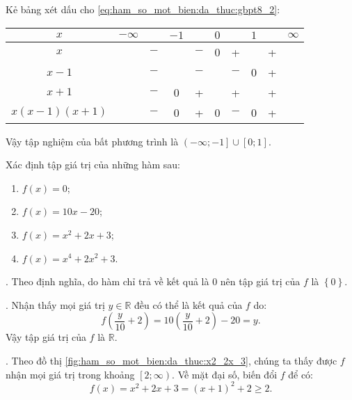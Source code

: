 Kẻ bảng xét dấu cho \ref{eq:ham_so_mot_bien:da_thuc:gbpt8_2}:
\begin{table}[H]
   \centering
   \begin{tabular}{|c|ccccccccc|}
      \hline
      $x$           & $-\infty$ &     & $-1$ &     & $0$ &     & $1$ &   & $\infty$ \\
      \hline
      $x$           &           & $-$ &      & $-$ &  0  &  +  &     & + &           \\
      \hline
      $x-1$         &           & $-$ &      & $-$ &     & $-$ &  0  & + &           \\
      \hline
      $x+1$         &           & $-$ &  0   &  +  &     &  +  &     & + &           \\
      \hline
      $x(x-1)(x+1)$ &           & $-$ &  0   &  +  &  0  & $-$ &  0  & + &           \\
      \hline
      \end{tabular}
\end{table}

Vậy tập nghiệm của bất phương trình là $\left(-\infty; -1\right] \cup \left[0; 1\right]$.

\exercise Xác định tập giá trị của những hàm sau:
\begin{multicols}{2}
   \begin{enumerate}
      \item $f(x) = 0$;
      \item $f(x) = 10x - 20$;
      \item $f(x) = x^2 + 2x + 3$;
      \item $f(x) = x^4 + 2x^2 + 3$.
   \end{enumerate}
\end{multicols}

\solution

\setcounter{subexercise}{1}
. Theo định nghĩa, do hàm chỉ trả về kết quả là $0$ nên tập giá trị của $f$ là $\left\{0\right\}$.

. Nhận thấy mọi giá trị $y \in \mathbb{R}$ đều có thể là kết quả của $f$ do:
$$f\left(\frac{y}{10} + 2\right) = 10 \left(\frac{y}{10} + 2\right) - 20 = y.$$
Vậy tập giá trị của $f$ là $\mathbb{R}$.

. Theo đồ thị \ref{fig:ham_so_mot_bien:da_thuc:x2_2x_3}, chúng ta thấy được $f$ nhận mọi giá trị trong khoảng $\left[2; \infty\right)$. Về mặt đại số, biến đổi $f$ để có:
$$f(x) = x^2 + 2x + 3 = (x + 1)^2 + 2 \geq 2.$$

